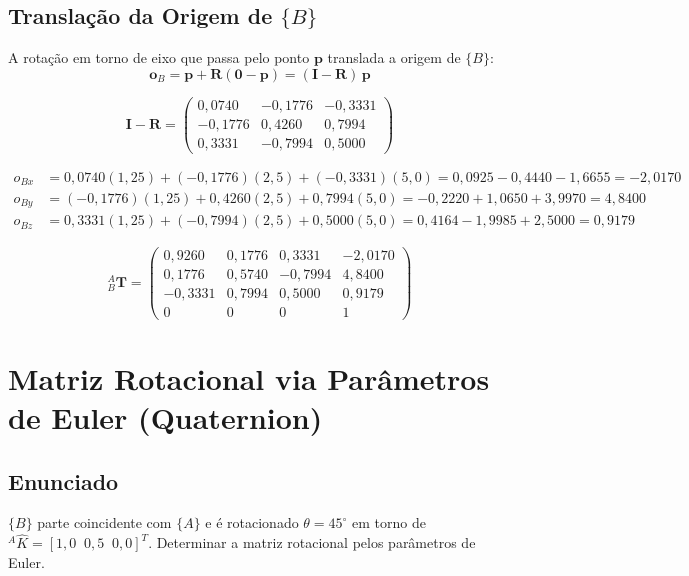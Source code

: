 \documentclass[12pt,a4paper]{article}
\newcommand{\Trans}[2]{{}^{#1}_{#2}\!\mathbf{T}}
\newcommand{\degr}{^{\circ}}
\begin{document}
\subsection{Translação da Origem de $\{B\}$}

A rotação em torno de eixo que passa pelo ponto $\mathbf{p}$ translada a origem de $\{B\}$:
\[
  \mathbf{o}_B = \mathbf{p} + \mathbf{R}(\mathbf{0} - \mathbf{p}) = (\mathbf{I} - \mathbf{R})\,\mathbf{p}
\]

\[
  \mathbf{I} - \mathbf{R} =
  \begin{pmatrix}
    0{,}0740 & -0{,}1776 & -0{,}3331 \\
   -0{,}1776 &  0{,}4260 &  0{,}7994 \\
    0{,}3331 & -0{,}7994 &  0{,}5000
  \end{pmatrix}
\]

\begin{align*}
  o_{Bx} &= 0{,}0740(1{,}25) + (-0{,}1776)(2{,}5) + (-0{,}3331)(5{,}0)
           = 0{,}0925 - 0{,}4440 - 1{,}6655 = -2{,}0170 \\
  o_{By} &= (-0{,}1776)(1{,}25) + 0{,}4260(2{,}5) + 0{,}7994(5{,}0)
           = -0{,}2220 + 1{,}0650 + 3{,}9970 = 4{,}8400 \\
  o_{Bz} &= 0{,}3331(1{,}25) + (-0{,}7994)(2{,}5) + 0{,}5000(5{,}0)
           = 0{,}4164 - 1{,}9985 + 2{,}5000 = 0{,}9179
\end{align*}

\begin{tcolorbox}[resultbox]
\[
\Trans{A}{B} =
\begin{pmatrix}
  0{,}9260 &  0{,}1776 &  0{,}3331 & -2{,}0170 \\
  0{,}1776 &  0{,}5740 & -0{,}7994 &  4{,}8400 \\
 -0{,}3331 &  0{,}7994 &  0{,}5000 &  0{,}9179 \\
  0        &  0        &  0        &  1
\end{pmatrix}
\]
\end{tcolorbox}

\newpage

\section{Matriz Rotacional via Parâmetros de Euler (Quaternion)}

\subsection*{Enunciado}
$\{B\}$ parte coincidente com $\{A\}$ e é rotacionado $\theta=45\degr$ em torno de
${}^{A}\hat{K} = [1{,}0\;\;0{,}5\;\;0{,}0]^T$. Determinar a matriz rotacional pelos parâmetros de Euler.
\end{document}
